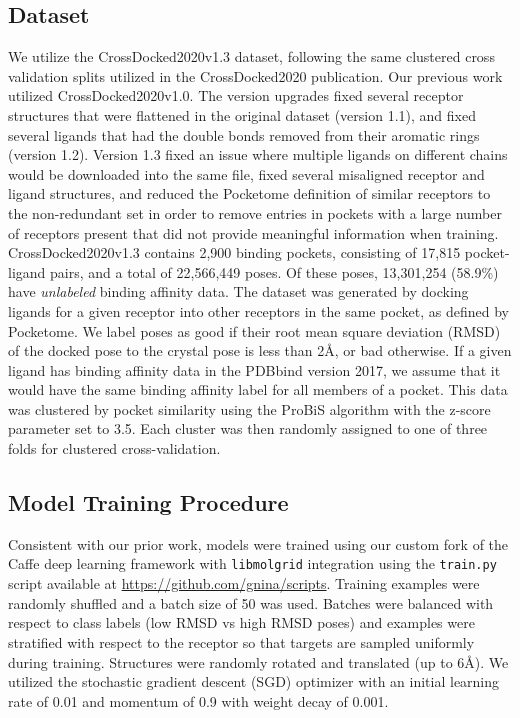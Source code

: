 \documentclass[journal=jcim,manuscript=article]{achemso}
\begin{document}
\subsection{Dataset}
We utilize the CrossDocked2020v1.3 dataset, following the same clustered cross validation splits utilized in the CrossDocked2020 publication.\cite{crossdocked2020}
Our previous work utilized CrossDocked2020v1.0\cite{crossdocked2020}.
The version upgrades fixed several receptor structures that were flattened in the original dataset (version 1.1), and fixed several ligands that had the double bonds removed from their aromatic rings (version 1.2).
Version 1.3 fixed an issue where multiple ligands on different chains would be downloaded into the same file, fixed several misaligned receptor and ligand structures, and reduced the Pocketome definition of similar receptors to the non-redundant set in order to remove entries in pockets with a large number of receptors present that did not provide meaningful information when training.
CrossDocked2020v1.3 contains 2,900 binding pockets, consisting of 17,815 pocket-ligand pairs, and a total of 22,566,449 poses.
Of these poses, 13,301,254 (58.9\%) have \emph{unlabeled} binding affinity data.
The dataset was generated by docking ligands for a given receptor into other receptors in the same pocket, as defined by Pocketome\cite{pocketome}.
We label poses as good if their root mean square deviation (RMSD) of the docked pose to the crystal pose is less than 2{\AA}, or bad otherwise.
If a given ligand has binding affinity data in the PDBbind version 2017, we assume that it would have the same binding affinity label for all members of a pocket.
This data was clustered by pocket similarity using the ProBiS \cite{ProBiS} algorithm with the z-score parameter set to 3.5.
Each cluster was then randomly assigned to one of three folds for clustered cross-validation.


\subsection{Model Training Procedure}
Consistent with our prior work\cite{crossdocked2020}, models were trained using our custom fork of the Caffe deep learning framework \cite{jia2014caffe} with \texttt{libmolgrid} integration \cite{sunseri2019libmolgrid} using the \texttt{train.py} script available at \url{https://github.com/gnina/scripts}.
Training examples were randomly shuffled and a batch size of 50 was used.
Batches were balanced with respect to class labels (low RMSD vs high RMSD poses) and examples were stratified with respect to the receptor so that targets are sampled uniformly during training.
Structures were randomly rotated and translated (up to 6{\AA}).
We utilized the stochastic gradient descent (SGD) optimizer with an initial learning rate of 0.01 and momentum of 0.9 with weight decay of 0.001.
\end{document}
